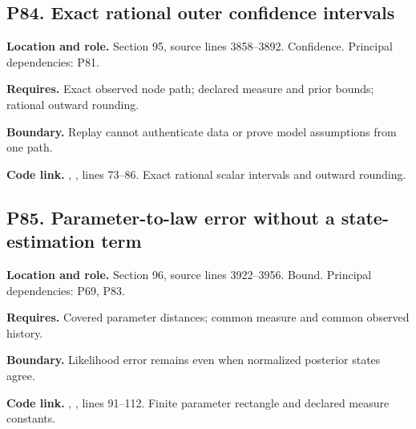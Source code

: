 \documentclass[11pt,oneside,openany]{book}
\numberwithin{equation}{section}
\begin{document}
\par\noindent\begin{minipage}{\textwidth}
\subsection{P84. Exact rational outer confidence
intervals}\label{LSMRegister:p84.-exact-rational-outer-confidence-intervals}

\textbf{Location and role.} Section 95, source lines 3858--3892.
Confidence. Principal dependencies: P81.

\textbf{Requires.} Exact observed node path; declared measure and prior
bounds; rational outward rounding.

\textbf{Boundary.} Replay cannot authenticate data or prove model
assumptions from one path.

\textbf{Code link.} ,
, lines 73--86. Exact rational scalar intervals
and outward rounding.
\end{minipage}\par\medskip

\par\noindent\begin{minipage}{\textwidth}
\subsection{P85. Parameter-to-law error without a state-estimation
term}\label{LSMRegister:p85.-parameter-to-law-error-without-a-state-estimation-term}

\textbf{Location and role.} Section 96, source lines 3922--3956. Bound.
Principal dependencies: P69, P83.

\textbf{Requires.} Covered parameter distances; common measure and
common observed history.

\textbf{Boundary.} Likelihood error remains even when normalized
posterior states agree.

\textbf{Code link.} ,
, lines 91--112. Finite parameter rectangle
and declared measure constants.
\end{minipage}\par\medskip
\end{document}
